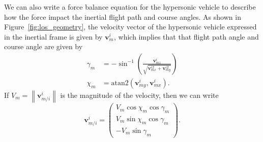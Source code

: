 \documentclass{article}
\newcommand{\norm}[1]{\left\|#1\right\|}
\newcommand{\vbf}{\mathbf{v}}
\begin{document}
We can also write a force balance equation for the hypersonic vehicle to describe how the force impact the inertial flight path and course angles.
As shown in Figure~\ref{fig:los_geometry}, the velocity vector of the hypersonic vehicle expressed in the inertial frame is given by $\vbf_m^i$, which implies that that flight path angle and course angle are given by
\begin{align*}
	\gamma_m &= -\sin^{-1}\left(\frac{\vbf_{mz}^i}{\sqrt{\vbf_{mx}^{i2}+\vbf_{my}^{i2}}}\right)\\
	\chi_m &= \text{atan2}(\vbf_{my}^i, \vbf_{mx}^i).
\end{align*}
If $V_m=\norm{\vbf_{m/i}^i}$ is the magnitude of the velocity, then we can write
\[
\vbf_{m/i}^i = \begin{pmatrix} V_m \cos\chi_m \cos\gamma_m \\ V_m\sin\chi_m\cos\gamma_m \\ -V_m\sin\gamma_m \end{pmatrix}.
\]
\end{document}
